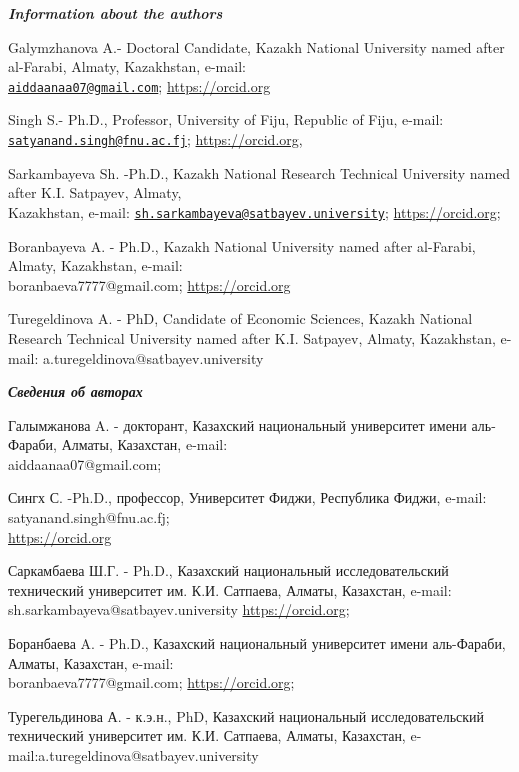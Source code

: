 \begin{authorinfo}
\emph{{\bfseries Information about the authors}}

Galymzhanova A.- Doctoral Candidate, Kazakh National University named
after al-Farabi, Almaty, Kazakhstan, e-mail:\\
\href{mailto:aiddaanaa07@gmail.com}{\nolinkurl{aiddaanaa07@gmail.com}};
\href{https://orcid.org/0009-0006-0462-2917}{https://orcid.org}

Singh S.- Ph.D., Professor, University of Fiju, Republic of Fiju,
e-mail:
\href{mailto:satyanand.singh@fnu.ac.fj}{\nolinkurl{satyanand.singh@fnu.ac.fj}};
\href{https://orcid.org/0000-0002-7707-031X}{https://orcid.org},

Sarkambayeva Sh. -Ph.D., Kazakh National Research Technical University
named after K.I. Satpayev, Almaty, \\Kazakhstan, e-mail:
\href{mailto:sh.sarkambayeva@satbayev.university}{\nolinkurl{sh.sarkambayeva@satbayev.university}};
\href{https://orcid.org/0000-0001-85093688}{https://orcid.org};

Boranbayeva A. - Ph.D., Kazakh National University named after
al-Farabi, Almaty, Kazakhstan, e-mail: \\boranbaeva7777@gmail.com;
\href{https://orcid.org/0000-0001-7239-9581}{https://orcid.org}

Turegeldinova A. - PhD, Candidate of Economic Sciences, Kazakh National
Research Technical University named after K.I. Satpayev, Almaty,
Kazakhstan, e-mail: a.turegeldinova@satbayev.university

\emph{{\bfseries Сведения об авторах}}

Галымжанова A. - докторант, Казахский национальный университет имени
аль-Фараби, Алматы, Казахстан, e-mail: \\aiddaanaa07@gmail.com;

Сингх С. -Ph.D., профессор, Университет Фиджи, Республика Фиджи, e-mail:
satyanand.singh@fnu.ac.fj;\\
\href{https://www.scopus.com/redirect.uri?url=https://orcid.org/0000-0002-7707-031X&authorId=55697935700&origin=AuthorProfile&orcId=0000-0002-7707-031X&category=orcidLink}{https://orcid.org}

Саркамбаева Ш.Г. - Ph.D., Казахский национальный исследовательский
технический университет им. К.И. Сатпаева, Алматы, Казахстан, e-mail:
sh.sarkambayeva@satbayev.university
\href{https://orcid.org/0000-0001-85093688}{https://orcid.org};

Боранбаева A. - Ph.D., Казахский национальный университет имени
аль-Фараби, Алматы, Казахстан, e-mail: \\boranbaeva7777@gmail.com;
\href{https://orcid.org/0000-0001-7239-9581}{https://orcid.org};

Турегельдинова А. - к.э.н., PhD, Казахский национальный
исследовательский технический университет им. К.И. Сатпаева, Алматы,
Казахстан, e-mail:a.turegeldinova@satbayev.university
\end{authorinfo}
